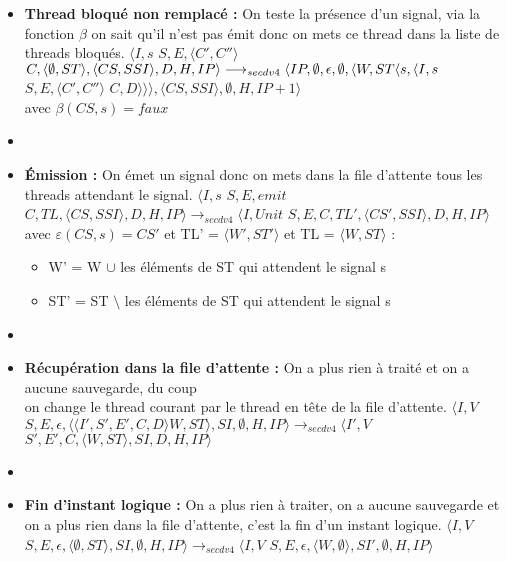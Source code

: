 \documentclass[10pt,a4paper]{article}
\begin{document}
\begin{enumerate}
\begin{itemize}
						\item[] \textbf{Thread bloqué non remplacé :} On teste la présence d'un signal, via la fonction $\beta$ on sait qu'il n'est pas émit donc on mets ce thread dans la liste de threads bloqués.
						\smallbreak 
						$\langle I,s$ $S,E,\langle C',C''\rangle$ $C,\langle \emptyset,ST\rangle,\langle CS,SSI\rangle,D,H,IP\rangle 
						\\\longrightarrow_{secdv4} \langle IP,\emptyset,\epsilon,\emptyset,\langle W,ST\langle s,\langle I,s$ $S,E,\langle C',C''\rangle$ $C,D\rangle\rangle\rangle,\langle CS,SSI\rangle,\emptyset,H,IP+1\rangle$ \\
						avec $\beta(CS,s) = faux$
						\item[]	
						\newpage
						\item[] \textbf{Émission :} On émet un signal donc on mets dans la file d'attente tous les threads attendant le signal.
						\smallbreak
						$\langle I,s$ $S,E,emit$ $C,TL,\langle CS,SSI\rangle,D,H,IP\rangle 
						\longrightarrow_{secdv4} \langle I,Unit$ $S,E,C,TL',\langle CS',SSI\rangle,D,H,IP\rangle$\\
						avec $\varepsilon(CS,s) = CS'$ et TL' = $\langle W',ST'\rangle$ et TL = $\langle W,ST\rangle$ :
						\begin{itemize}
							\item[] W' = W $\cup$ les éléments de ST qui attendent le signal s 
							\item[] ST' = ST $\setminus$ les éléments de ST qui attendent le signal s 
						\end{itemize}
						\item[]
						\item[] \textbf{Récupération dans la file d'attente :} On a plus rien à traité et on a aucune sauvegarde, du coup 
						\\on change le thread courant par le thread en tête de la file d'attente.
						\smallbreak
						$\langle I,V$ $S,E,\epsilon,\langle\langle I',S',E',C,D\rangle W,ST\rangle,SI,\emptyset,H,IP\rangle 
						\longrightarrow_{secdv4} \langle I',V$ $S',E',C,\langle W,ST\rangle,SI,D,H,IP\rangle$
						\item[]
						\item[] \textbf{Fin d'instant logique :} On a plus rien à traiter, on a aucune sauvegarde et on a plus rien dans la file d'attente, c'est la fin d'un instant logique.
						\smallbreak
						$\langle I,V$ $S,E,\epsilon,\langle\emptyset,ST\rangle,SI,\emptyset,H,IP\rangle 
						\longrightarrow_{secdv4} \langle I,V$ $S,E,\epsilon,\langle W,\emptyset\rangle,SI',\emptyset,H,IP\rangle$\\

\end{itemize}
\end{enumerate}
\end{document}
